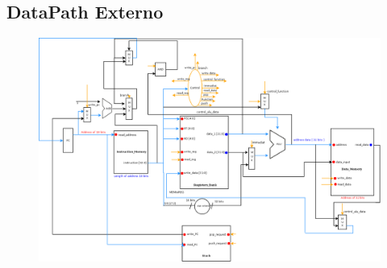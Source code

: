 \documentclass{report}
\begin{document}
\begin{landscape}
\chapter{DataPath Externo}
      	\begin{figure}[H]
      		\centering
      		\includegraphics[width=\textwidth]{./pictures/datapath/DataPath.png}
      	\end{figure}
\end{landscape}
% 
% 
\end{document}
